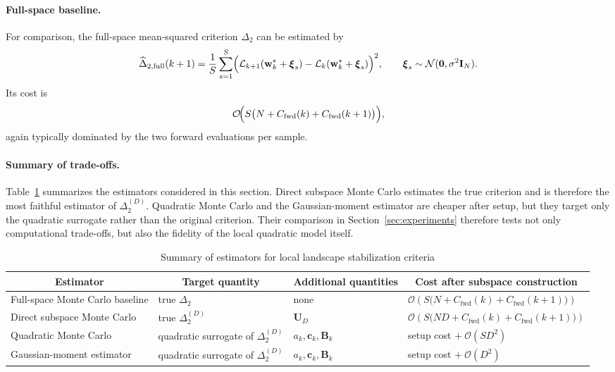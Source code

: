\documentclass[10pt]{article}
\theoremstyle{plain}
\theoremstyle{remark}
\begin{document}
\paragraph{Full-space baseline.}
For comparison, the full-space mean-squared criterion $\Delta_2$ can be estimated by
\begin{equation}
\label{eq:fullspace-mc}
\widehat{\Delta}_{2,\mathrm{full}}(k+1)
=
\frac{1}{S}\sum_{s=1}^S
\Bigl(
\mathcal L_{k+1}(\mathbf w_k^*+\boldsymbol{\xi}_s)
-
\mathcal L_k(\mathbf w_k^*+\boldsymbol{\xi}_s)
\Bigr)^2,
\qquad
\boldsymbol{\xi}_s \sim \mathcal N(\mathbf 0,\sigma^2\mathbf I_N).
\end{equation}
Its cost is
\[
\mathcal O\!\Bigl(
S\bigl(
N + C_{\mathrm{fwd}}(k)+C_{\mathrm{fwd}}(k+1)
\bigr)
\Bigr),
\]
again typically dominated by the two forward evaluations per sample.

\paragraph{Summary of trade-offs.}
Table~\ref{tab:estimator-summary} summarizes the estimators considered in this section.
Direct subspace Monte Carlo estimates the true criterion and is therefore the most faithful estimator of $\Delta_2^{(D)}$.
Quadratic Monte Carlo and the Gaussian-moment estimator are cheaper after setup, but they target only the quadratic surrogate rather than the original criterion.
Their comparison in Section~\ref{sec:experiments} therefore tests not only computational trade-offs, but also the fidelity of the local quadratic model itself.

\begin{table}[t]
\caption{Summary of estimators for local landscape stabilization criteria}
\label{tab:estimator-summary}
\begin{center}
\small
\begin{tabular}{p{3.0cm} p{2.5cm} p{2.0cm} p{3.0cm}}
\toprule
\multicolumn{1}{c}{\bf Estimator} &
\multicolumn{1}{c}{\bf Target quantity} &
\multicolumn{1}{c}{\bf Additional quantities} &
\multicolumn{1}{c}{\bf Cost after subspace construction}
\\
\midrule
Full-space Monte Carlo baseline
&
true $\Delta_2$
&
none
&
$\mathcal O\!\left(S\bigl(N + C_{\mathrm{fwd}}(k)+C_{\mathrm{fwd}}(k+1)\bigr)\right)$
\\[0.5em]

Direct subspace Monte Carlo
&
true $\Delta_2^{(D)}$
&
$\mathbf U_D$
&
$\mathcal O\!\left(S\bigl(ND + C_{\mathrm{fwd}}(k)+C_{\mathrm{fwd}}(k+1)\bigr)\right)$
\\[0.5em]

Quadratic Monte Carlo
&
quadratic surrogate of $\Delta_2^{(D)}$
&
$a_k,\mathbf c_k,\mathbf B_k$
&
setup cost $+\ \mathcal O(SD^2)$
\\[0.5em]

Gaussian-moment estimator
&
quadratic surrogate of $\Delta_2^{(D)}$
&
$a_k,\mathbf c_k,\mathbf B_k$
&
setup cost $+\ \mathcal O(D^2)$
\\
\bottomrule
\end{tabular}
\end{center}
\end{table}
\end{document}
